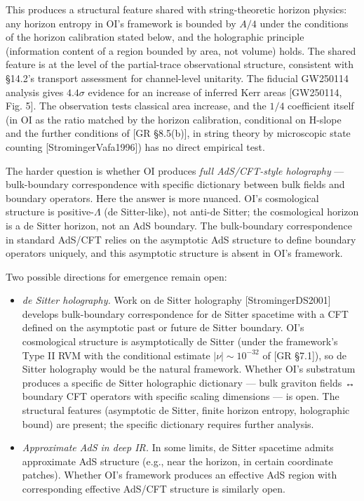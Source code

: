 \documentclass[
]{article}
\begin{document}
This produces a structural feature shared with string-theoretic horizon
physics: any horizon entropy in OI's framework is bounded by \(A/4\)
under the conditions of the horizon calibration stated below, and the
holographic principle (information content of a region bounded by area,
not volume) holds. The shared feature is at the level of the
partial-trace observational structure, consistent with §14.2's transport
assessment for channel-level unitarity. The fiducial GW250114 analysis
gives \(4.4\sigma\) evidence for an increase of inferred Kerr areas
{[}GW250114, Fig. 5{]}. The observation tests classical area increase,
and the \(1/4\) coefficient itself (in OI as the ratio matched by the
horizon calibration, conditional on H-slope and the further conditions
of {[}GR §8.5(b){]}, in string theory by microscopic state counting
{[}StromingerVafa1996{]}) has no direct empirical test.

The harder question is whether OI produces \emph{full AdS/CFT-style
holography} --- bulk-boundary correspondence with specific dictionary
between bulk fields and boundary operators. Here the answer is more
nuanced. OI's cosmological structure is positive-\(\Lambda\) (de
Sitter-like), not anti-de Sitter; the cosmological horizon is a de
Sitter horizon, not an AdS boundary. The bulk-boundary correspondence in
standard AdS/CFT relies on the asymptotic AdS structure to define
boundary operators uniquely, and this asymptotic structure is absent in
OI's framework.

Two possible directions for emergence remain open:

\begin{itemize}
\item
  \emph{de Sitter holography.} Work on de Sitter holography
  {[}StromingerDS2001{]} develops bulk-boundary correspondence for de
  Sitter spacetime with a CFT defined on the asymptotic past or future
  de Sitter boundary. OI's cosmological structure is asymptotically de
  Sitter (under the framework's Type II RVM with the conditional
  estimate \(|\nu| \sim 10^{-32}\) of {[}GR §7.1{]}), so de Sitter
  holography would be the natural framework. Whether OI's substratum
  produces a specific de Sitter holographic dictionary --- bulk graviton
  fields ↔ boundary CFT operators with specific scaling dimensions ---
  is open. The structural features (asymptotic de Sitter, finite horizon
  entropy, holographic bound) are present; the specific dictionary
  requires further analysis.
\item
  \emph{Approximate AdS in deep IR.} In some limits, de Sitter spacetime
  admits approximate AdS structure (e.g., near the horizon, in certain
  coordinate patches). Whether OI's framework produces an effective AdS
  region with corresponding effective AdS/CFT structure is similarly
  open.
\end{itemize}
\end{document}
